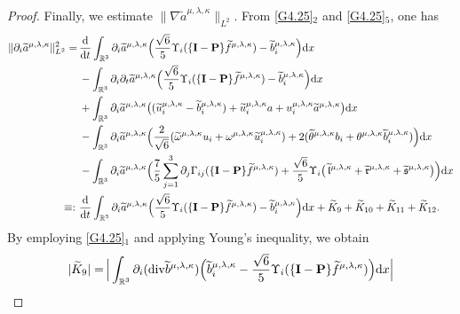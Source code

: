 \documentclass[reqno,11pt]{amsart}
\theoremstyle{plain}
\numberwithin{equation}{section}
\begin{document}
\begin{proof}
Finally, we   estimate $\|\nabla\widetilde{a}^{\mu,\lambda,\kappa}\|_{L^2}$.
From \eqref{G4.25}$_2$ and \eqref{G4.25}$_5$, one has
\begin{align}\label{G4.32}
\|  \partial_i \widetilde{a}^{\mu,\lambda,\kappa} \|_{L^2}^2
=\, & \frac{\mathrm{d}}{\mathrm{d} t} \int_{\mathbb{R}^3}   \partial_i \widetilde{a}^{\mu,\lambda,\kappa}  \Big(\frac{\sqrt{6}}{5} \Upsilon_i(\{\mathbf{I}-\mathbf{P}\} \widetilde{f}^{\mu,\lambda,\kappa})-\widetilde{b}^{\mu,\lambda,\kappa}_i\Big) \mathrm{d} x \nonumber\\
& -\int_{\mathbb{R}^3}   \partial_i \partial_t\widetilde{a}^{\mu,\lambda,\kappa}   \Big(\frac{\sqrt{6}}{5} \Upsilon_i(\{\mathbf{I}-\mathbf{P}\} \widetilde{f}^{\mu,\lambda,\kappa})-\widetilde{b}^{\mu,\lambda,\kappa}_i\Big) \mathrm{d} x \nonumber\\
& +\int_{\mathbb{R}^3}  \partial_i \widetilde{a}^{\mu,\lambda,\kappa}  \big( (\widetilde{u}^{\mu,\lambda,\kappa}_i-\widetilde{b}^{\mu,\lambda,\kappa}_i)+\widetilde{u}^{\mu,\lambda,\kappa}_i a+ {u}_i^{\mu,\lambda,\kappa}\widetilde{a}^{\mu,\lambda,\kappa} \big){\rm d}x\nonumber \\
& -\int_{\mathbb{R}^3}  \partial_i \widetilde{a}^{\mu,\lambda,\kappa}  \Big(  \frac{2}{\sqrt{6}} (\widetilde\omega^{\mu,\lambda,\kappa} u_i+\omega^{\mu,\lambda,\kappa} \widetilde{u}^{\mu,\lambda,\kappa}_i)+2 (\widetilde\theta^{\mu,\lambda,\kappa} b_i+\theta^{\mu,\lambda,\kappa}\widetilde{b}^{\mu,\lambda,\kappa}_i)\Big){\rm d}x\nonumber \\
& - \int_{\mathbb{R}^3}  \partial_i \widetilde{a}^{\mu,\lambda,\kappa}\Big(\frac{7}{5} \sum_{j=1}^3 \partial_j \Gamma_{i j}(\{\mathbf{I}-\mathbf{P}\} \widetilde{f}^{\mu,\lambda,\kappa})+\frac{\sqrt{6}}{5} \Upsilon_i\big(\,\widetilde{\mathfrak{l}}^{\mu,\lambda,\kappa}+\widetilde{\mathfrak{r}}^{\mu,\lambda,\kappa}
+\widetilde{\mathfrak{s}}^{\mu,\lambda,\kappa}\big)\Big) \mathrm{d}x\nonumber\\
\equiv:\,\,&\frac{\mathrm{d}}{\mathrm{d} t} \int_{\mathbb{R}^3}   \partial_i \widetilde{a}^{\mu,\lambda,\kappa}  \Big(\frac{\sqrt{6}}{5} \Upsilon_i(\{\mathbf{I}-\mathbf{P}\} \widetilde{f}^{\mu,\lambda,\kappa})-\widetilde{b}^{\mu,\lambda,\kappa}_i\Big) \mathrm{d}x+\widetilde{K}_9+\widetilde{K}_{10}+\widetilde{K}_{11}+\widetilde{K}_{12}. 
\end{align}
By employing \eqref{G4.25}$_1$ and applying Young's inequality, we obtain  
\begin{align*}
|\widetilde{K}_9 | =&\,\Big|\int_{\mathbb{R}^3}  \partial_i ({\rm div}   \widetilde{b}^{\mu,\lambda,\kappa})  \Big(\widetilde{b}^{\mu,\lambda,\kappa}_i-\frac{\sqrt{6}}{5} \Upsilon_i(\{\mathbf{I}-\mathbf{P}\} \widetilde{f}^{\mu,\lambda,\kappa})\Big) \mathrm{d} x\Big|\\

\end{align*}
\end{proof}
\end{document}
